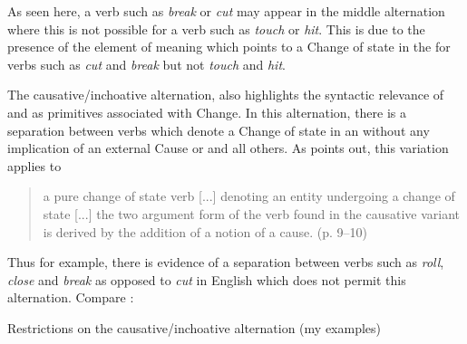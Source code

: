 As seen here, a verb such as \textit{break} or \textit{cut} may appear in the middle
alternation where this is not possible for a verb such as \textit{touch} or
\textit{hit}.  This is due to the presence of the element of meaning \BECOME
which points to a Change of state in the  for verbs
such as \textit{cut} and \textit{break} but not \textit{touch} and \textit{hit}.

The causative\slash inchoative alternation, also highlights the syntactic
relevance of \CAUSE and \BECOME as primitives associated with Change.
In this alternation, there is a separation between verbs which denote
a Change of state in an  without any implication of
an external Cause or  and all others.  As \citet{Levin1993}
points out, this variation applies to

\begin{quote}
a pure change of state verb [...] denoting an entity undergoing a change
of state [...] the two argument form of the verb found in the causative
variant is derived by the addition of a notion of a cause. (p. 9--10)
\end{quote}

Thus for example, there is evidence of a separation between verbs such
as \textit{roll}, \textit{close} and \textit{break} as opposed to \textit{cut} in English which
does not permit this alternation.  Compare :\largerpage

\ea%
\label{ex:4:16}
Restrictions on the causative\slash inchoative alternation (my examples)\\
\z \z


